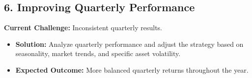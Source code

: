 \documentclass[12pt]{article}
\begin{document}
\subsection*{6. Improving Quarterly Performance}
\textbf{Current Challenge:} Inconsistent quarterly results.
\begin{itemize}
    \item \textbf{Solution:} Analyze quarterly performance and adjust the strategy based on seasonality, market trends, and specific asset volatility.
    \item \textbf{Expected Outcome:} More balanced quarterly returns throughout the year.
\end{itemize}
\end{document}

